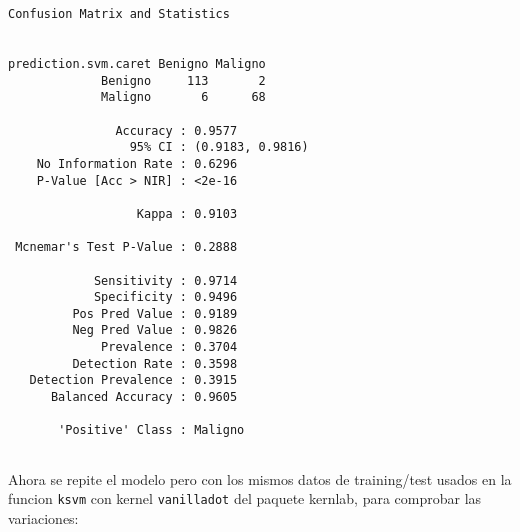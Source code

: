 \documentclass[
]{article}
\newenvironment{Shaded}{\begin{snugshade}}{\end{snugshade}}
\newcommand{\CommentTok}[1]{\textcolor[rgb]{0.56,0.35,0.01}{\textit{#1}}}
\newcommand{\DataTypeTok}[1]{\textcolor[rgb]{0.13,0.29,0.53}{#1}}
\newcommand{\KeywordTok}[1]{\textcolor[rgb]{0.13,0.29,0.53}{\textbf{#1}}}
\newcommand{\NormalTok}[1]{#1}
\newcommand{\OperatorTok}[1]{\textcolor[rgb]{0.81,0.36,0.00}{\textbf{#1}}}
\newcommand{\OtherTok}[1]{\textcolor[rgb]{0.56,0.35,0.01}{#1}}
\newcommand{\StringTok}[1]{\textcolor[rgb]{0.31,0.60,0.02}{#1}}
\begin{document}
\begin{verbatim}
Confusion Matrix and Statistics

                    
prediction.svm.caret Benigno Maligno
             Benigno     113       2
             Maligno       6      68
                                          
               Accuracy : 0.9577          
                 95% CI : (0.9183, 0.9816)
    No Information Rate : 0.6296          
    P-Value [Acc > NIR] : <2e-16          
                                          
                  Kappa : 0.9103          
                                          
 Mcnemar's Test P-Value : 0.2888          
                                          
            Sensitivity : 0.9714          
            Specificity : 0.9496          
         Pos Pred Value : 0.9189          
         Neg Pred Value : 0.9826          
             Prevalence : 0.3704          
         Detection Rate : 0.3598          
   Detection Prevalence : 0.3915          
      Balanced Accuracy : 0.9605          
                                          
       'Positive' Class : Maligno         
                                          
\end{verbatim}

Ahora se repite el modelo pero con los mismos datos de training/test
usados en la funcion \texttt{ksvm} con kernel \texttt{vanilladot} del
paquete kernlab, para comprobar las variaciones:

\begin{Shaded}
\end{Shaded}
\end{document}
